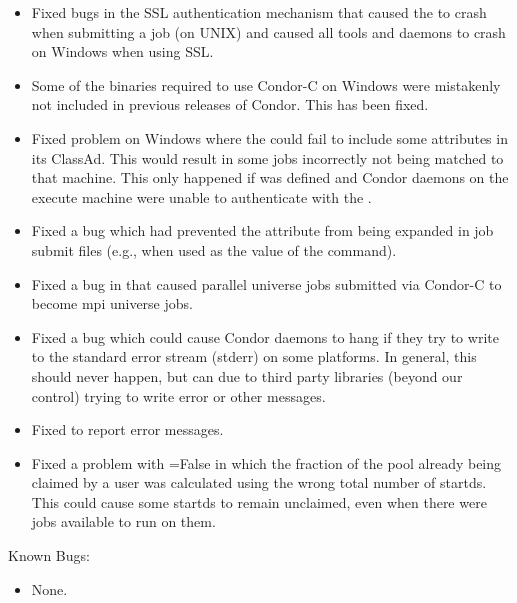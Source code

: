 \begin{itemize}
\item Fixed bugs in the SSL authentication mechanism that caused the
 to crash when submitting a job (on UNIX) and caused
all tools and daemons to crash on Windows when using SSL.

\item Some of the binaries required to use Condor-C on Windows were
mistakenly not included in previous releases of Condor. This has been
fixed.

\item Fixed problem on Windows where the  could fail to
include some attributes in its ClassAd. This would result in some jobs
incorrectly not being matched to that machine.  This only happened if
 was defined and Condor daemons on the execute
machine were unable to authenticate with the .

\item Fixed a  bug which had prevented the
 attribute from being expanded in job submit files
(e.g., when used as the value of the  command).

\item Fixed a bug in  that caused parallel universe jobs
submitted via Condor-C to become mpi universe jobs.

\item Fixed a bug which could cause Condor daemons to hang if they try
to write to the standard error stream (stderr) on some platforms.  In
general, this should never happen, but can due to third party
libraries (beyond our control) trying to write error or other messages.

\item Fixed  to report error messages.

\item Fixed a problem with =False
in which the fraction of the pool already being claimed by a user was
calculated using the wrong total number of startds.  This could cause
some startds to remain unclaimed, even when there were jobs available
to run on them.

\end{itemize}

\noindent Known Bugs:

\begin{itemize}

\item None.

\end{itemize}




